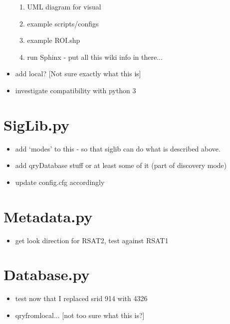 \documentclass[letterpaper,10pt,english]{sphinxmanual}
\begin{document}
\begin{itemize}
\begin{enumerate}
\item {} 
UML diagram for visual

\item {} 
example scripts/configs

\item {} 
example ROI.shp

\item {} 
run Sphinx - put all this wiki info in there...

\end{enumerate}

\item {} 
add local? {[}Not sure exactly what this is{]}

\item {} 
investigate compatibility with python 3

\end{itemize}


\section{SigLib.py}
\label{todo:siglib-py}\begin{itemize}
\item {} 
add `modes' to this - so that siglib can do what is described above.

\item {} 
add qryDatabase stuff or at least some of it (part of discovery mode)

\item {} 
update config.cfg accordingly

\end{itemize}


\section{Metadata.py}
\label{todo:metadata-py}\begin{itemize}
\item {} 
get look direction for RSAT2, test against RSAT1

\end{itemize}


\section{Database.py}
\label{todo:database-py}\begin{itemize}
\item {} 
test now that I replaced srid 914 with 4326

\item {} 
qryfromlocal... {[}not too sure what this is?{]}

\end{itemize}
\end{document}
